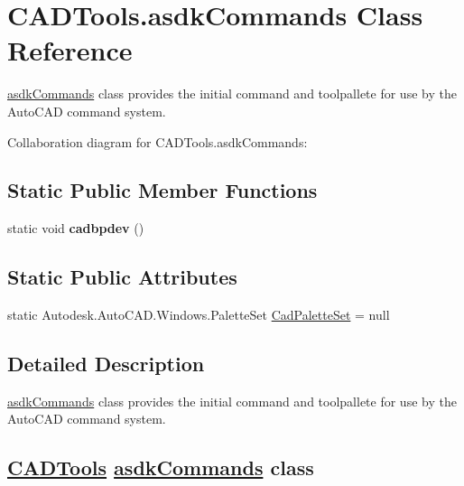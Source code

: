 \hypertarget{class_c_a_d_tools_1_1asdk_commands}{}\section{C\+A\+D\+Tools.\+asdk\+Commands Class Reference}
\label{class_c_a_d_tools_1_1asdk_commands}


\mbox{\hyperlink{class_c_a_d_tools_1_1asdk_commands}{asdk\+Commands}} class provides the initial command and toolpallete for use by the Auto\+C\+AD command system.  




Collaboration diagram for C\+A\+D\+Tools.\+asdk\+Commands\+:
\subsection*{Static Public Member Functions}
\begin{DoxyCompactItemize}
\item 
\mbox{\label{class_c_a_d_tools_1_1asdk_commands_ac5d5c3d3926493ad35ced2053f931e08}} 
static void {\bfseries cadbpdev} ()
\end{DoxyCompactItemize}
\subsection*{Static Public Attributes}
\begin{DoxyCompactItemize}
\item 
static Autodesk.\+Auto\+C\+A\+D.\+Windows.\+Palette\+Set \mbox{\hyperlink{class_c_a_d_tools_1_1asdk_commands_adb7b7f118a05b939e18f040e3b679d22}{Cad\+Palette\+Set}} = null
\end{DoxyCompactItemize}


\subsection{Detailed Description}
\mbox{\hyperlink{class_c_a_d_tools_1_1asdk_commands}{asdk\+Commands}} class provides the initial command and toolpallete for use by the Auto\+C\+AD command system. 

\subsection*{\mbox{\hyperlink{namespace_c_a_d_tools}{C\+A\+D\+Tools}} \mbox{\hyperlink{class_c_a_d_tools_1_1asdk_commands}{asdk\+Commands}} class}

